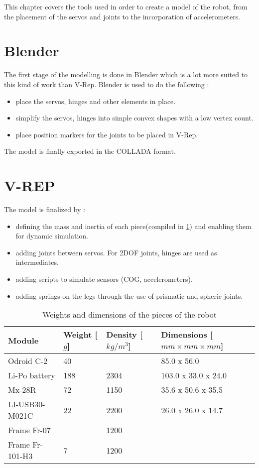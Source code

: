 This chapter covers the tools used in order to create a model of the robot, from the placement of the servos and joints to the incorporation of accelerometers.

\section{Blender}
The first stage of the modelling is done in Blender which is a lot more suited to this kind of work than V-Rep. 
Blender is used to do the following :
\begin{itemize}
\item place the servos, hinges and other elements in place.
\item simplify the servos, hinges into simple convex shapes with a low vertex count.
\item place position markers for the joints to be placed in V-Rep.
\end{itemize}

The model is finally exported in the COLLADA format.

\section{V-REP}
The model is finalized by :
\begin{itemize}
\item defining the mass and inertia of each piece(compiled in \cref{table:weights}) and enabling them for dynamic simulation.
\item adding joints between servos. For 2DOF joints, hinges are used as intermediates.
\item adding scripts to simulate sensors (COG, accelerometers).
\item adding springs on the legs through the use of prismatic and spheric joints.
\end{itemize}

\begin{table}[htp]
\center
\begin{tabularx}{\textwidth}{@{} X X X l @{}}
\toprule
\textbf{Module} & \textbf{Weight [$g$]} &  \textbf{Density [$kg/m^3$]}& \textbf{Dimensions [$mm \times mm \times mm$]}\\ 
\midrule
Odroid C-2 & 40 &  & 85.0 x 56.0\\
Li-Po battery & 188 & 2304 & 103.0 x 33.0 x 24.0\\
Mx-28R & 72 & 1150 & 35.6 x 50.6 x 35.5\\
LI-USB30-M021C & 22 & 2200 & 26.0 x 26.0 x 14.7\\
Frame Fr-07 & & 1200 & \\
Frame Fr-101-H3 & 7 & 1200 & \\
\bottomrule
\end{tabularx}
\caption{Weights and dimensions of the pieces of the robot}
\label{table:weights}
\end{table}

